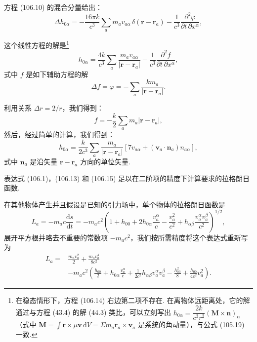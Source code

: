 方程 (106.10) 的混合分量给出：
\begin{equation}
  \Delta h_{0\alpha}
  =-\frac{16\pi k}{c^{3}}\sum_a m_av_{a\alpha}\,
  \delta(\boldsymbol{r}-\boldsymbol{r}_a)
  -\frac{1}{c^{3}}\frac{\partial^{2}\varphi}
  {\partial t\,\partial x^{\alpha}},
\end{equation}

这个线性方程的解是\footnote{在稳态情形下，方程 (106.14) 右边第二项不存在. 在离物体远距离处，它的解通过与方程 (43.4) 的解 (44.3) 类比，可以立刻写出 $h_{0\alpha}=\dfrac{2k}{c^{3}r^{2}}(\boldsymbol{M}\times\boldsymbol{n})_{\alpha}$（式中 $\boldsymbol{M}=\int\boldsymbol{r}\times\mu\boldsymbol{v}\,\mathrm{d}V=\Sigma m_{a}\boldsymbol{r}_{a}\times\boldsymbol{v}_{a}$ 是系统的角动量），与公式 (105.19) 一致.}
\begin{equation*}
  h_{0\alpha}
  =\frac{4k}{c^{3}}\sum_a\frac{m_av_{a\alpha}}
  {|\boldsymbol{r}-\boldsymbol{r}_a|}
  -\frac{1}{c^{3}}\frac{\partial^{2}f}{\partial t\,\partial x^{\alpha}},
\end{equation*}
式中 $f$ 是如下辅助方程的解
\begin{equation*}
  \Delta f=\varphi
  =-\sum_a\frac{km_a}{|\boldsymbol{r}-\boldsymbol{r}_a|}.
\end{equation*}

利用关系 $\Delta r=2/r$，我们得到：
\begin{equation*}
  f=-\frac{k}{2}\sum_a m_a|\boldsymbol{r}-\boldsymbol{r}_a|,
\end{equation*}
然后，经过简单的计算，我们得到：
\begin{equation}
  h_{0\alpha}
  =\frac{k}{2c^{3}}\sum_a
  \frac{m_a}{|\boldsymbol{r}-\boldsymbol{r}_a|}
  \left[7v_{a\alpha}
  +(\boldsymbol{v}_a\cdot\boldsymbol{n}_a)n_{a\alpha}\right],
\end{equation}
式中 $\boldsymbol{n}_a$ 是沿矢量 $\boldsymbol{r}-\boldsymbol{r}_a$ 方向的单位矢量.

表达式 (106.1)，(106.13) 和 (106.15) 足以在二阶项的精度下计算要求的拉格朗日函数.

在其他物体产生并且假设是已知的引力场中，单个物体的拉格朗日函数是
\begin{equation*}
  L_a=-m_ac\frac{\mathrm{d}s}{\mathrm{d}t}
  =-m_ac^{2}\left(1+h_{00}
  +2h_{0\alpha}\frac{v_a^{\alpha}}{c}
  -\frac{v_a^{2}}{c^{2}}
  +h_{\alpha\beta}\frac{v_a^{\alpha}v_a^{\beta}}{c^{2}}\right)^{1/2},
\end{equation*}
展开平方根并略去不重要的常数项 $-m_ac^{2}$，我们按所需精度将这个表达式重新写为
\begin{equation}
\begin{aligned}
  L_a={}&\frac{m_av_a^{2}}{2}
  +\frac{m_av_a^{4}}{8c^{2}}\\
  &-m_ac^{2}\left(\frac{h_{00}}{2}
  +h_{0\alpha}\frac{v_a^{\alpha}}{c}
  +\frac{1}{2c^{2}}h_{\alpha\beta}v_a^{\alpha}v_a^{\beta}
  -\frac{h_{00}^{2}}{8}
  +\frac{h_{00}}{4c^{2}}v_a^{2}\right).
\end{aligned}
\end{equation}

